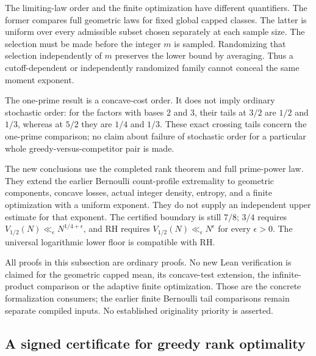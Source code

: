 \documentclass[11pt]{article}
\theoremstyle{definition}
\begin{document}
The limiting-law order and the finite optimization have different
quantifiers. The former compares full geometric laws for fixed
global capped classes. The latter is uniform over every admissible
subset chosen separately at each sample size.
The selection must be made before the integer $m$ is sampled.
Randomizing that selection independently of $m$ preserves the lower
bound by averaging. Thus a cutoff-dependent or independently
randomized family cannot conceal the same moment exponent.

The one-prime result is a concave-cost order.
It does not imply ordinary stochastic order: for the factors with
bases $2$ and $3$, their tails at $3/2$ are $1/2$ and $1/3$,
whereas at $5/2$ they are $1/4$ and $1/3$.
These exact crossing tails concern the one-prime comparison;
no claim about failure of stochastic order for a particular
whole greedy-versus-competitor pair is made.

The new conclusions use the completed rank theorem and full
prime-power law. They extend the earlier Bernoulli count-profile
extremality to geometric components, concave losses, actual integer
density, entropy, and a finite optimization with a uniform exponent.
They do not supply an independent upper estimate for that exponent.
The certified boundary is still $7/8$; $3/4$ requires
$V_{1/2}(N)\ll_\epsilon N^{1/4+\epsilon}$, and RH requires
$V_{1/2}(N)\ll_\epsilon N^\epsilon$ for every $\epsilon>0$.
The universal logarithmic lower floor is compatible with RH.

All proofs in this subsection are ordinary proofs.
No new Lean verification is claimed for the geometric capped mean,
its concave-test extension, the infinite-product comparison or the
adaptive finite optimization. Those are the concrete formalization
consumers; the earlier finite Bernoulli tail comparisons remain
separate compiled inputs.
No established originality priority is asserted.

\subsection{A signed certificate for greedy rank optimality}
\label{sec:ordered-stream-greedy}
\end{document}
